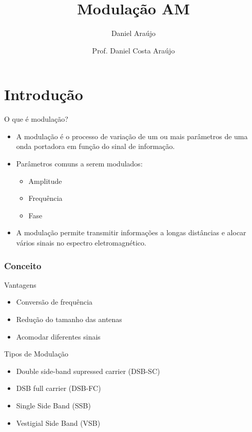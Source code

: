 \documentclass[10pt,hyperref={pdfpagemode=FullScreen},aspectratio=169]{beamer}
\title{\doctitle}
\author{Daniel Araújo}
\institute{\universidade}
\title{Modulação AM}
\author{Prof. Daniel Costa Araújo}
\begin{document}
\frame{\titlepage}


\section{Introdução}

\begin{frame}{O que é modulação?}
  \begin{itemize}
      \item A modulação é o processo de variação de um ou mais parâmetros de uma onda portadora em função do sinal de informação.
      \item Parâmetros comuns a serem modulados:
      \begin{itemize}
          \item Amplitude
          \item Frequência
          \item Fase
      \end{itemize}
      \item A modulação permite transmitir informações a longas distâncias e alocar vários sinais no espectro eletromagnético.
  \end{itemize}
  \end{frame}

\begin{frame}
 
    \frametitle{Conceito}

\begin{block}{Vantagens}

    \begin{itemize}
        \item Conversão de frequência
        \item Redução do tamanho das antenas
        \item Acomodar diferentes sinais 
    \end{itemize}
    
\end{block}


\begin{block}{Tipos de Modulação}
    \begin{itemize}
        \item Double side-band supressed carrier (DSB-SC)
        \item DSB full carrier (DSB-FC)
        \item Single Side Band (SSB)
        \item Vestigial Side Band (VSB)
    \end{itemize}
    
\end{block}
\end{frame}
\end{document}
